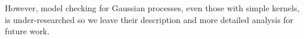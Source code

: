 \documentclass{article}
\def\ie{i.e.\ }
\def\eg{e.g.\ }
\begin{document}
However, model checking for Gaussian processes, even those with simple kernels, is under-researched so we leave their description and more detailed analysis for future work.






\end{document}
